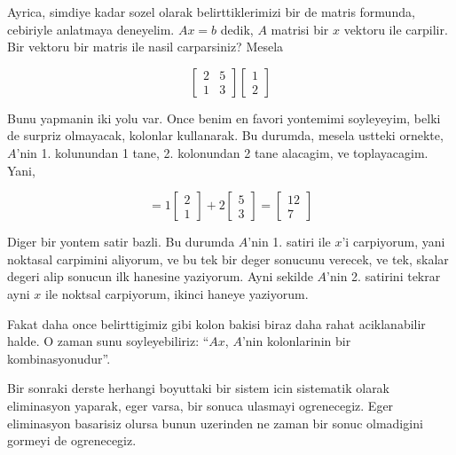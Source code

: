 \documentclass[12pt,fleqn]{article}\usepackage{../common}
\begin{document}
Ayrica, simdiye kadar sozel olarak belirttiklerimizi bir de matris
formunda, cebiriyle anlatmaya deneyelim. $Ax=b$ dedik, $A$ matrisi bir $x$
vektoru ile carpilir. Bir vektoru bir matris ile nasil carparsiniz? Mesela

$$ 
\left[\begin{array}{rr}
2 & 5 \\
1 & 3
\end{array}\right]
\left[\begin{array}{r}
1 \\
2
\end{array}\right]
 $$

Bunu yapmanin iki yolu var. Once benim en favori yontemimi soyleyeyim,
belki de surpriz olmayacak, kolonlar kullanarak. Bu durumda, mesela ustteki
ornekte, $A$'nin 1. kolunundan 1 tane, 2. kolonundan 2 tane alacagim, ve
toplayacagim. Yani,

$$ =
1
\left[\begin{array}{r}
2 \\
1
\end{array}\right]
+
2
\left[\begin{array}{r}
5 \\
3
\end{array}\right]
=
\left[\begin{array}{r}
12 \\
7
\end{array}\right]
 $$

Diger bir yontem satir bazli. Bu durumda $A$'nin 1. satiri ile $x$'i
carpiyorum, yani noktasal carpimini aliyorum, ve bu tek bir deger sonucunu
verecek, ve tek, skalar degeri alip sonucun ilk hanesine yaziyorum. Ayni
sekilde $A$'nin 2. satirini tekrar ayni $x$ ile noktsal carpiyorum, ikinci
haneye yaziyorum. 

Fakat daha once belirttigimiz gibi kolon bakisi biraz daha rahat
aciklanabilir halde. O zaman sunu soyleyebiliriz: ``$Ax$, $A$'nin
kolonlarinin bir kombinasyonudur''. 

Bir sonraki derste herhangi boyuttaki bir sistem icin sistematik olarak
eliminasyon yaparak, eger varsa, bir sonuca ulasmayi ogrenecegiz. Eger
eliminasyon basarisiz olursa bunun uzerinden ne zaman bir sonuc olmadigini
gormeyi de ogrenecegiz. 
\end{document}
